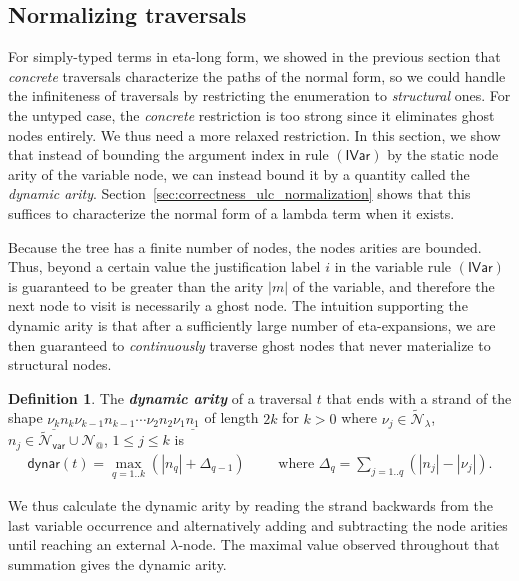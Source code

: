 \documentclass[xchauthor,chkrefs,GCNS,amsmath,amsthm,rotating,leaveRGB]{tcsg}
\makeatletter
\renewcommand{\index}[1]{}
\theoremstyle{plain}
\theoremstyle{definition}
\newtheorem{definition}{Definition}[section]
\newcommand{\Nodes}{\mathcal{N}}
\newcommand{\NodesApp}{\Nodes_@}
\newcommand{\ExtendedNodesVar}{\tilde{\Nodes}_{\mathsf{var}}}
\newcommand{\ExtendedNodesLmd}{\tilde{\Nodes}_{\lambda}}
\newcommand{\dynar}{\textsf{dynar}}
\makeatother
\begin{document}
\subsection{Normalizing traversals}\label{sec4.3}


For simply-typed terms in eta-long form, we showed in the previous section
that \emph{concrete} traversals characterize the paths of the normal form, so
we could handle the infiniteness of traversals by restricting the enumeration
to \emph{structural} ones. For the untyped case, the \emph{concrete}
restriction is too strong since it eliminates ghost nodes entirely. We thus
need a more relaxed restriction. In this section, we show that instead of
bounding the argument index in rule $\mathbf {(\mathsf{IVar})}$ by the static
node arity of the variable node, we can instead bound it by a quantity called
the \emph{dynamic arity}. Section~\ref{sec:correctness_ulc_normalization}
shows that this suffices to characterize the normal form of a lambda term
when it exists.

Because the tree has a finite number of nodes, the nodes arities are bounded.
Thus, beyond a certain value the justification label $i$ in the variable rule
$\mathsf{(IVar)}$ is guaranteed to be greater than the arity $|m|$ of the
variable, and therefore the next node to visit is necessarily a ghost node.
The intuition supporting the dynamic arity is that after a sufficiently large
number of eta-expansions, we are then guaranteed to \emph{continuously}
traverse ghost nodes that never materialize to structural nodes.

\begin{definition} \label{dfn:dynamic-arity}
The \textbf{\emph{dynamic arity}}\index{dynamic arity} of a traversal $t$
that ends with a strand of the shape $\underline{\nu _{k}} n_{k} \nu _{k-1}
n_{k-1}\cdots \nu _{2} n_{2} \nu _{1} \underline{n_{1}}$ of length $2k$ for
$k>0$ where $\nu _{j} \in \ExtendedNodesLmd $, $n_{j} \in \ExtendedNodesVar
\cup  \NodesApp $, $1\leq j\leq k$ is
%
\begin{eqnarray*}
\dynar (t)
= \max _{q=1..k} \left ( |n_{q}| + \Delta _{q-1} \right )
\qquad
\mbox{ where }
\Delta _{q} = \sum _{j=1..q} (|n_{j}|-|\nu _{j}|).
\end{eqnarray*}
\end{definition}

We thus calculate the dynamic arity by reading the strand backwards from the
last variable occurrence and alternatively adding and subtracting the node
arities until reaching an external $\lambda $-node. The maximal value
observed throughout that summation gives the dynamic arity.
\end{document}
